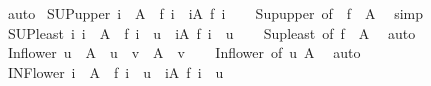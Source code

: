 \begin{isabellebody}
\ auto%
\endisatagproof
{\isafoldproof}%
%
\isadelimproof
\isanewline
%
\endisadelimproof
\isanewline
{}\isamarkupfalse%
\ SUP{\isacharunderscore}{\kern0pt}upper{\isacharcolon}{\kern0pt}\ {\isachardoublequoteopen}i\ {\isasymin}\ A\ {\isasymLongrightarrow}\ f\ i\ {\isasymle}\ {\isacharparenleft}{\kern0pt}{\isasymSqunion}i{\isasymin}A{\isachardot}{\kern0pt}\ f\ i{\isacharparenright}{\kern0pt}{\isachardoublequoteclose}\isanewline
%
\isadelimproof
\ \ %
\endisadelimproof
%
\isatagproof
{}\isamarkupfalse%
\ Sup{\isacharunderscore}{\kern0pt}upper\ {\isacharbrackleft}{\kern0pt}of\ {\isacharunderscore}{\kern0pt}\ {\isachardoublequoteopen}f\ {\isacharbackquote}{\kern0pt}\ A{\isachardoublequoteclose}{\isacharbrackright}{\kern0pt}\ \isamarkupfalse%
\ simp%
\endisatagproof
{\isafoldproof}%
%
\isadelimproof
\isanewline
%
\endisadelimproof
\isanewline
{}\isamarkupfalse%
\ SUP{\isacharunderscore}{\kern0pt}least{\isacharcolon}{\kern0pt}\ {\isachardoublequoteopen}{\isacharparenleft}{\kern0pt}{\isasymAnd}i{\isachardot}{\kern0pt}\ i\ {\isasymin}\ A\ {\isasymLongrightarrow}\ f\ i\ {\isasymle}\ u{\isacharparenright}{\kern0pt}\ {\isasymLongrightarrow}\ {\isacharparenleft}{\kern0pt}{\isasymSqunion}i{\isasymin}A{\isachardot}{\kern0pt}\ f\ i{\isacharparenright}{\kern0pt}\ {\isasymle}\ u{\isachardoublequoteclose}\isanewline
%
\isadelimproof
\ \ %
\endisadelimproof
%
\isatagproof
{}\isamarkupfalse%
\ Sup{\isacharunderscore}{\kern0pt}least\ {\isacharbrackleft}{\kern0pt}of\ {\isachardoublequoteopen}f\ {\isacharbackquote}{\kern0pt}\ A{\isachardoublequoteclose}{\isacharbrackright}{\kern0pt}\ \isamarkupfalse%
\ auto%
\endisatagproof
{\isafoldproof}%
%
\isadelimproof
\isanewline
%
\endisadelimproof
\isanewline
{}\isamarkupfalse%
\ Inf{\isacharunderscore}{\kern0pt}lower{}{\isacharcolon}{\kern0pt}\ {\isachardoublequoteopen}u\ {\isasymin}\ A\ {\isasymLongrightarrow}\ u\ {\isasymle}\ v\ {\isasymLongrightarrow}\ {\isasymSqinter}A\ {\isasymle}\ v{\isachardoublequoteclose}\isanewline
%
\isadelimproof
\ \ %
\endisadelimproof
%
\isatagproof
{}\isamarkupfalse%
\ Inf{\isacharunderscore}{\kern0pt}lower\ {\isacharbrackleft}{\kern0pt}of\ u\ A{\isacharbrackright}{\kern0pt}\ \isamarkupfalse%
\ auto%
\endisatagproof
{\isafoldproof}%
%
\isadelimproof
\isanewline
%
\endisadelimproof
\isanewline
{}\isamarkupfalse%
\ INF{\isacharunderscore}{\kern0pt}lower{}{\isacharcolon}{\kern0pt}\ {\isachardoublequoteopen}i\ {\isasymin}\ A\ {\isasymLongrightarrow}\ f\ i\ {\isasymle}\ u\ {\isasymLongrightarrow}\ {\isacharparenleft}{\kern0pt}{\isasymSqinter}i{\isasymin}A{\isachardot}{\kern0pt}\ f\ i{\isacharparenright}{\kern0pt}\ {\isasymle}\ u{\isachardoublequoteclose}\isanewline

\end{isabellebody}
